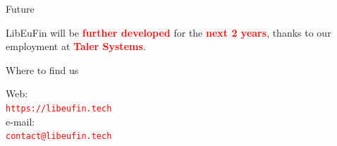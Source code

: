 \documentclass[pdf, aspectratio=169]{beamer}
\newcommand{\boldred}[1]{\textcolor{red}{\textbf{#1}}}
\begin{document}
\begin{frame}{Future}
  \begin{center}
  LibEuFin will be \boldred{further developed} for the \boldred{next 2 years},
  thanks to our employment at \boldred{Taler Systems}.
  \end{center}
\end{frame}

\begin{frame}{Where to find us}
  \begin{center}
  Web: \\ \textcolor{red}{\tt{https://libeufin.tech}} \\
  e-mail: \\ \textcolor{red}{\tt{contact@libeufin.tech}}
  \end{center}
\end{frame}
\end{document}

